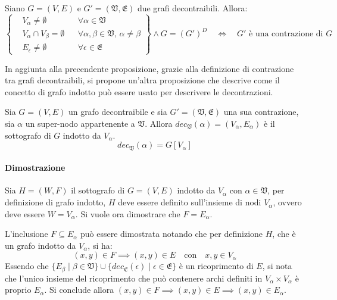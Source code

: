     \begin{proposition}
        Siano $G = (V, E)$ e $G' = (\mathfrak{V}, \mathfrak{E})$ due grafi decontraibili. Allora:
        \begin{equation*}
            \left\{
            \begin{aligned}
                &V_\alpha \neq \emptyset  &&\forall \alpha \in \mathfrak{V} \\
                &V_{\alpha} \cap V_{\beta} = \emptyset &&\forall \alpha, \beta \in \mathfrak{V}, \, \alpha \neq \beta \\
                &E_{\epsilon} \neq \emptyset  &&\forall \epsilon \in \mathfrak{E}
            \end{aligned}
            \right\}
            \land G = (G')^D \quad \Longleftrightarrow \quad G' \text{ è una contrazione di } G
        \end{equation*}
    \end{proposition}

    In aggiunta alla precendente proposizione, grazie alla definizione di contrazione tra grafi decontraibili,
    si propone un'altra proposizione che descrive come il concetto di grafo indotto pu\`o essere usato per descrivere
    le decontrazioni.

    \begin{proposition}
    Sia $G=(V, E)$ un grafo decontraibile e sia $G' = (\mathfrak{V}, \mathfrak{E})$ una sua contrazione,
    sia $\alpha$ un super-nodo appartenente a $\mathfrak{V}$.
    Allora $dec_{\mathfrak{V}}(\alpha) = (V_\alpha, E_\alpha)$ \`e il sottografo di $G$ indotto da $V_\alpha$.
    \begin{equation*}
        dec_{\mathfrak{V}}(\alpha) = G[V_\alpha]
    \end{equation*}
    \end{proposition}

    \paragraph{Dimostrazione}
    Sia $H = (W, F)$ il sottografo di $G = (V, E)$ indotto da $V_\alpha$ con
    $\alpha \in \mathfrak{V}$, per definizione di grafo indotto, $H$ deve essere definito sull'insieme di nodi
    $V_\alpha$, ovvero deve essere $W = V_\alpha$.
    Si vuole ora dimostrare che $F = E_\alpha$. \newline

    L'inclusione $F \subseteq E_\alpha$ pu\`o essere dimostrata notando che per definizione $H$,
    che \`e un grafo indotto da $V_\alpha$, si ha:
    \begin{equation*}
    (x, y) \in F \implies (x, y) \in E \quad \text{con} \quad x, y \in V_{\alpha}
    \end{equation*}
    Essendo che $\{ E_\beta \mid \beta \in \mathfrak{V}\}
    \cup \{ dec_{\mathfrak{E}}(\epsilon) \mid \epsilon \in \mathfrak{E}\}$ \`e un ricoprimento di $E$, si nota che
    l'unico insieme del ricoprimento che pu\`o contenere archi definiti in $V_\alpha \times V_\alpha$
    \`e proprio $E_\alpha$. Si conclude allora $(x, y) \in F \implies (x, y) \in E \implies (x, y) \in E_\alpha $.
    \newline

